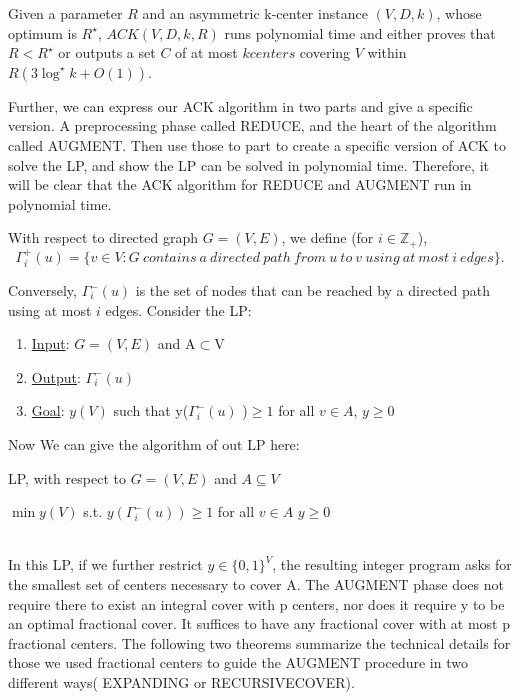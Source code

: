 \begin{theorem}
Given a parameter $ R $ and an asymmetric k-center instance $(V,D,k)$, whose optimum is $R^\star$, $ACK(V,D,k,R) $ runs polynomial time and either proves that $ R<R^\star $ or outputs a set $C$ of at most $k centers$ covering $V$ within $R(3\log^\star k + O(1))$.
\end{theorem}

Further, we can express our ACK algorithm in two parts and give a specific version. A preprocessing phase called REDUCE, and the heart of the algorithm called AUGMENT. Then use those to part to create a specific version of ACK to solve the LP, and show the LP can be solved in polynomial time. Therefore, it will be clear that the ACK algorithm for REDUCE and AUGMENT run in polynomial time.

\begin{definition}
With respect to directed graph $G=(V,E)$, we define (for $i\in \mathbb{Z}_+$),
$$\Gamma_i^+(u)=\{v\in V : G \ contains \ a \ directed\  path\ from\ u\ to\ v\ using\ at\ most\ i\ edges \}.$$
\end{definition}
Conversely, $\Gamma_i^-(u)$ is the set of nodes that can be reached by a directed path using at most $i$ edges. Consider the LP:

\begin{enumerate}
\item \underline{Input}: $G=(V, E)$ and A$\subset$V
\item \underline{Output}: $\Gamma_i^-(u)$
\item \underline{Goal}: \min $y(V)$ such that y($\Gamma_i^-(u)$ )$\geq 1$ for all $v \in A$, $y \geq 0$
\end{enumerate}

Now We can give the algorithm of out LP here:\\
\begin{algorithm}
\caption{LP, with respect to $G=(V,E)$ and $A \subseteq V$}
 $\min y(V)$ \;
 s.t. $y(\Gamma_i^-(u))\geq 1$ for all $v \in A$\;
 $y\geq 0$\;
\end{algorithm}\\
In this LP, if we further restrict $y\in \{ 0, 1\}^V$, the resulting integer program asks for the smallest set of centers necessary to cover A. The AUGMENT phase does not require there to exist an integral cover with p centers, nor does it require y to be an optimal fractional cover. It suffices to have any fractional cover with at most p fractional centers. The following two theorems summarize the technical details for those we used fractional centers to guide the AUGMENT procedure in two different ways( EXPANDING or RECURSIVECOVER).

